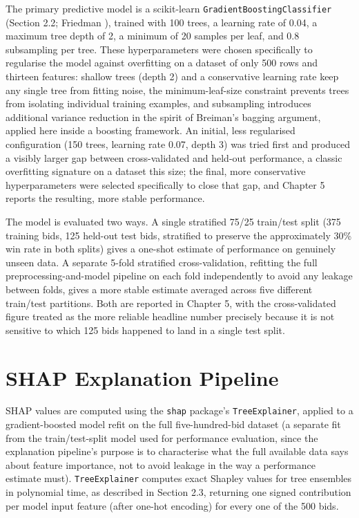 \documentclass[12pt,oneside]{report}
\begin{document}
The primary predictive model is a scikit-learn
\texttt{GradientBoostingClassifier} (Section 2.2; Friedman
\citeyearpar{friedman2001greedy}), trained with 100 trees, a learning
rate of 0.04, a maximum tree depth of 2, a minimum of 20 samples per
leaf, and 0.8 subsampling per tree. These hyperparameters were chosen
specifically to regularise the model against overfitting on a dataset of
only 500 rows and thirteen features: shallow trees (depth 2) and a
conservative learning rate keep any single tree from fitting noise, the
minimum-leaf-size constraint prevents trees from isolating individual
training examples, and subsampling introduces additional variance
reduction in the spirit of Breiman's \citeyearpar{breiman2001random}
bagging argument, applied here inside a boosting framework. An initial,
less regularised configuration (150 trees, learning rate 0.07, depth 3)
was tried first and produced a visibly larger gap between
cross-validated and held-out performance, a classic overfitting
signature on a dataset this size; the final, more conservative
hyperparameters were selected specifically to close that gap, and
Chapter 5 reports the resulting, more stable performance.

The model is evaluated two ways. A single stratified 75/25 train/test
split (375 training bids, 125 held-out test bids, stratified to preserve
the approximately 30\% win rate in both splits) gives a one-shot
estimate of performance on genuinely unseen data. A separate 5-fold
stratified cross-validation, refitting the full preprocessing-and-model
pipeline on each fold independently to avoid any leakage between folds,
gives a more stable estimate averaged across five different train/test
partitions. Both are reported in Chapter 5, with the cross-validated
figure treated as the more reliable headline number precisely because it
is not sensitive to which 125 bids happened to land in a single test
split.

\hypertarget{shap-explanation-pipeline}{%
\section{SHAP Explanation Pipeline}\label{shap-explanation-pipeline}}

SHAP values are computed using the \texttt{shap} package's
\texttt{TreeExplainer}, applied to a gradient-boosted model refit on the
full five-hundred-bid dataset (a separate fit from the train/test-split
model used for performance evaluation, since the explanation pipeline's
purpose is to characterise what the full available data says about
feature importance, not to avoid leakage in the way a performance
estimate must). \texttt{TreeExplainer} computes exact Shapley values for
tree ensembles in polynomial time, as described in Section 2.3,
returning one signed contribution per model input feature (after one-hot
encoding) for every one of the 500 bids.
\end{document}

